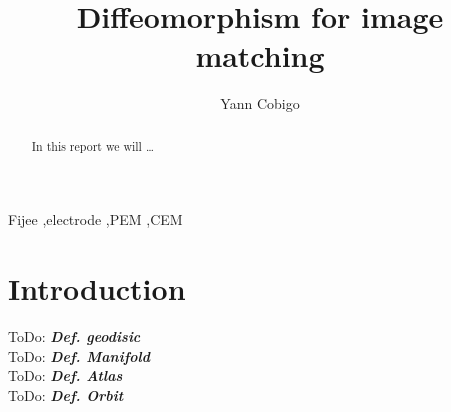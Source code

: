 \documentclass[preprint,review,8pt,times]{elsarticle}
\newcommand{\ToDo}[1]{ToDo: \textbf{\textit{#1}}}
\begin{document}
\begin{frontmatter}

\title{Diffeomorphism for image matching}

\author[label1]{Yann Cobigo}
\address[label1]{University of California, San Francisco | ucsf.edu}




\begin{abstract}
In this report we will \dots
\end{abstract}

\begin{keyword}
Fijee \sep electrode \sep PEM \sep CEM
\end{keyword}

\end{frontmatter}


\section{Introduction}

\ToDo{Def. geodisic} \\
\ToDo{Def. Manifold} \\
\ToDo{Def. Atlas} \\
\ToDo{Def. Orbit} \\
\end{document}
